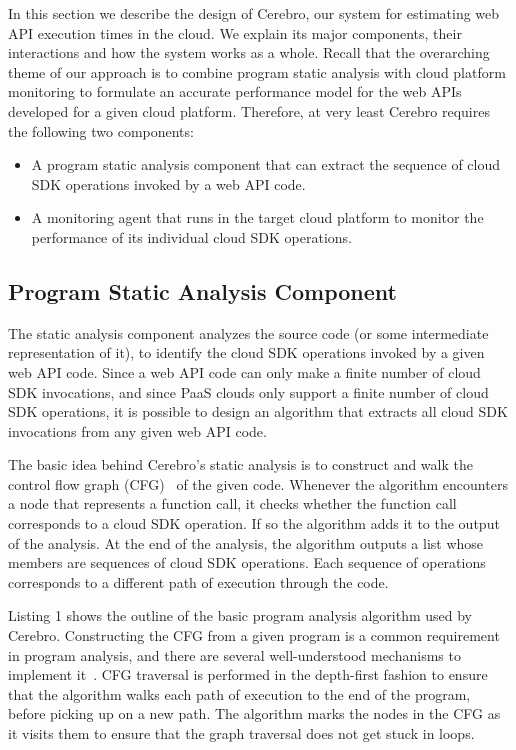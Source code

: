 In this section we describe the design of Cerebro, our system for estimating web API execution times
in the cloud. We explain its major components, their interactions and how the 
system works as a whole. Recall that the overarching theme of our approach is to combine program
static analysis with cloud platform monitoring to formulate an accurate performance model for the 
web APIs developed for a given cloud platform. Therefore, at very least Cerebro requires the following 
two components:

\begin{itemize}
\item A program static analysis component that can extract the sequence of cloud SDK operations invoked by a web API
code.
\item A monitoring agent that runs in the target cloud platform to monitor the performance of its individual cloud SDK
operations.
\end{itemize}
 
 \subsection{Program Static Analysis Component}
 The static analysis component analyzes the source code (or some intermediate representation of it), to identify
 the cloud SDK operations invoked by a given web API code. Since a web API code can only make a finite
 number of cloud SDK invocations, and since PaaS clouds only support a finite number of cloud
 SDK operations, it is possible to design an algorithm that
 extracts all cloud SDK invocations from any given web API code. 

The basic idea behind Cerebro's static analysis is to construct and walk the
 control flow graph (CFG)~\cite{Allen:1970:CFA:800028.808479} of the given code. Whenever the 
 algorithm encounters a node that represents a function call,
 it checks whether the function call corresponds to a cloud SDK operation. If so the algorithm
adds it to the output of the analysis. At the end of the analysis, the algorithm outputs a list whose members are
sequences of cloud SDK operations. Each sequence of operations corresponds to a different
path of execution through the code.

Listing 1 shows the outline of the basic program analysis algorithm used by Cerebro. 
Constructing the CFG from a given program is a common requirement
in program analysis, and there are several well-understood mechanisms to implement it~\cite{Aho:1986:CPT:6448,Morgan:1998:BOC:288765,Muchnick:1998:ACD:286076}. 
CFG traversal is performed in the depth-first 
fashion to ensure that the algorithm walks each path of execution to the end of the program, before picking up on
a new path. The algorithm marks the nodes in the CFG as it visits them to ensure that the graph traversal does not 
get stuck in loops. 

